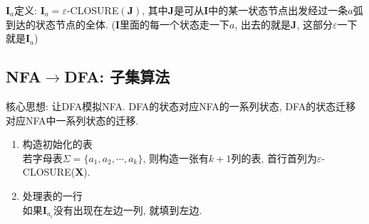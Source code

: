         $\mathbf{I}_a$定义: $\mathbf{I}_a=\varepsilon$-CLOSURE$(\mathbf{J})$, 其中$\mathbf{J}$是可从$\mathbf{I}$中的某一状态节点出发经过一条$a$弧到达的状态节点的全体. ($\mathbf{I}$里面的每一个状态走一下$a$, 出去的就是$\mathbf{J}$, 这部分$\varepsilon$一下就是$\mathbf{I}_a$)

    \subsection{NFA$\to$DFA: 子集算法}

        核心思想: 让DFA模拟NFA. DFA的状态对应NFA的一系列状态, DFA的状态迁移对应NFA中一系列状态的迁移.

        \begin{enumerate}
            \item 构造初始化的表 \\
                若字母表$\Sigma=\{a_1,a_2,\cdots,a_k\}$, 则构造一张有$k+1$列的表, 首行首列为$\varepsilon$-CLOSURE($\mathbf{X}$).
            \item 处理表的一行 \\
                如果$\mathbf{I}_{a_i}$没有出现在左边一列, 就填到左边. 


\end{enumerate}
